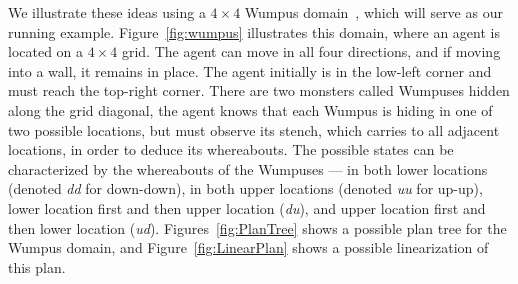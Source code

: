 \documentclass[letterpaper]{article}
\numberwithin{equation}{section}	%
\begin{document}
We illustrate these ideas using a $4 \times 4$ Wumpus domain~\citep{AlborePG09}, which will serve as our running example.
Figure~\ref{fig:wumpus} illustrates this domain, where an agent is located on a $4 \times 4$ grid. The agent can move in all four directions, and if moving into a wall, it remains in place. The agent initially is in the low-left corner and must reach the top-right corner.
There are two monsters called Wumpuses hidden along the grid diagonal, the agent knows that each Wumpus is hiding in one of two possible locations, but must observe its stench, which carries to all adjacent locations, in order to deduce its whereabouts. The possible states can be characterized by the whereabouts of the Wumpuses --- in both lower locations (denoted {\em dd} for down-down), in both upper locations (denoted {\em uu} for up-up), lower location first and then upper location ({\em du}), and upper location first and then lower location ({\em ud}).
Figures~\ref{fig:PlanTree} shows a possible plan tree for the Wumpus domain, and Figure~\ref{fig:LinearPlan} shows a possible linearization of this plan.
\end{document}
